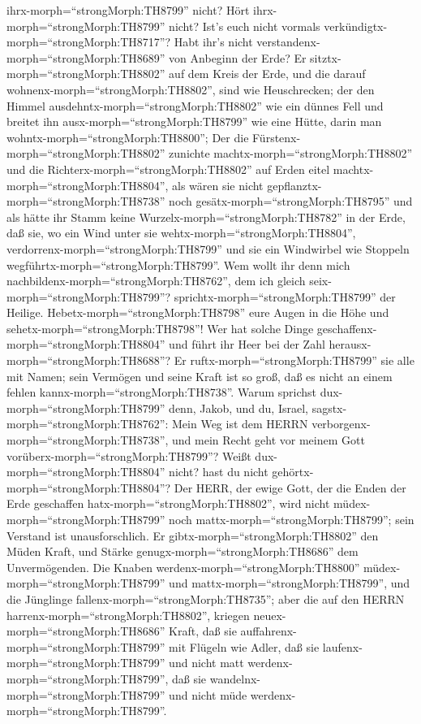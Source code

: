 ihrx-morph=``strongMorph:TH8799'' nicht? Hört
ihrx-morph=``strongMorph:TH8799'' nicht? Ist's euch nicht vormals
verkündigtx-morph=``strongMorph:TH8717''? Habt ihr's nicht
verstandenx-morph=``strongMorph:TH8689'' von Anbeginn der Erde?
 Er sitztx-morph=``strongMorph:TH8802'' auf dem Kreis der
Erde, und die darauf wohnenx-morph=``strongMorph:TH8802'', sind wie
Heuschrecken; der den Himmel ausdehntx-morph=``strongMorph:TH8802'' wie
ein dünnes Fell und breitet ihn ausx-morph=``strongMorph:TH8799'' wie
eine Hütte, darin man wohntx-morph=``strongMorph:TH8800''; 
Der die Fürstenx-morph=``strongMorph:TH8802'' zunichte
machtx-morph=``strongMorph:TH8802'' und die
Richterx-morph=``strongMorph:TH8802'' auf Erden eitel
machtx-morph=``strongMorph:TH8804'',  als wären sie nicht
gepflanztx-morph=``strongMorph:TH8738'' noch
gesätx-morph=``strongMorph:TH8795'' und als hätte ihr Stamm keine
Wurzelx-morph=``strongMorph:TH8782'' in der Erde, daß sie, wo ein Wind
unter sie wehtx-morph=``strongMorph:TH8804'',
verdorrenx-morph=``strongMorph:TH8799'' und sie ein Windwirbel wie
Stoppeln wegführtx-morph=``strongMorph:TH8799''.  Wem wollt
ihr denn mich nachbildenx-morph=``strongMorph:TH8762'', dem ich gleich
seix-morph=``strongMorph:TH8799''? sprichtx-morph=``strongMorph:TH8799''
der Heilige.  Hebetx-morph=``strongMorph:TH8798'' eure
Augen in die Höhe und sehetx-morph=``strongMorph:TH8798''! Wer hat
solche Dinge geschaffenx-morph=``strongMorph:TH8804'' und führt ihr Heer
bei der Zahl herausx-morph=``strongMorph:TH8688''? Er
ruftx-morph=``strongMorph:TH8799'' sie alle mit Namen; sein Vermögen und
seine Kraft ist so groß, daß es nicht an einem fehlen
kannx-morph=``strongMorph:TH8738''.  Warum sprichst
dux-morph=``strongMorph:TH8799'' denn, Jakob, und du, Israel,
sagstx-morph=``strongMorph:TH8762'': Mein Weg ist dem HERRN
verborgenx-morph=``strongMorph:TH8738'', und mein Recht geht vor meinem
Gott vorüberx-morph=``strongMorph:TH8799''?  Weißt
dux-morph=``strongMorph:TH8804'' nicht? hast du nicht
gehörtx-morph=``strongMorph:TH8804''? Der HERR, der ewige Gott, der die
Enden der Erde geschaffen hatx-morph=``strongMorph:TH8802'', wird nicht
müdex-morph=``strongMorph:TH8799'' noch
mattx-morph=``strongMorph:TH8799''; sein Verstand ist unausforschlich.
 Er gibtx-morph=``strongMorph:TH8802'' den Müden Kraft, und
Stärke genugx-morph=``strongMorph:TH8686'' dem Unvermögenden.
 Die Knaben werdenx-morph=``strongMorph:TH8800''
müdex-morph=``strongMorph:TH8799'' und
mattx-morph=``strongMorph:TH8799'', und die Jünglinge
fallenx-morph=``strongMorph:TH8735'';  aber die auf den
HERRN harrenx-morph=``strongMorph:TH8802'', kriegen
neuex-morph=``strongMorph:TH8686'' Kraft, daß sie
auffahrenx-morph=``strongMorph:TH8799'' mit Flügeln wie Adler, daß sie
laufenx-morph=``strongMorph:TH8799'' und nicht matt
werdenx-morph=``strongMorph:TH8799'', daß sie
wandelnx-morph=``strongMorph:TH8799'' und nicht müde
werdenx-morph=``strongMorph:TH8799''.

